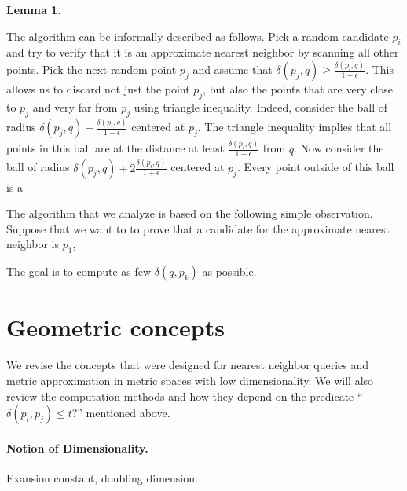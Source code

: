 \documentclass[10pt]{article}
\newcommand{\eps}{\epsilon}
\newcommand{\dist}{\delta}
\newtheorem{lemma}[theorem]{Lemma}
\begin{document}
\begin{lemma}
\end{lemma}


The algorithm can be informally described as follows. Pick a random candidate $p_i$ and try to verify that
it is an approximate nearest neighbor by scanning all other points. Pick the next random point $p_j$
and assume that $\dist(p_j, q) \geq \frac{\dist(p_i, q)}{1 + \eps}$. This allows us to discard not just the point
$p_j$, but also the points that are very close to $p_j$ and very far from $p_j$ using triangle inequality.
Indeed, consider the ball of radius $ \dist(p_j, q) - \frac{ \dist(p_i, q) }{ 1+\eps} $ centered at $p_j$.
The triangle inequality implies that all points in this ball are at the distance at least $\frac{ \dist(p_i, q) }{ 1+\eps}$
from $q$. Now consider the ball of radius $\dist(p_j, q) + 2 \frac{\dist(p_i, q)}{1+ \eps}$ centered at $p_j$. 
Every point outside of this ball is a


The algorithm that we analyze is based on the following simple observation.
Suppose that we want to to prove that a candidate for the approximate nearest neighbor is $p_1$,



\begin{algorithmic}
\Function{ApproximateNearestNeighbor}{$P, q, \eps$}
\EndFor
{}
\Else
\EndIf
\EndFunction
\end{algorithmic}


The goal is to compute
as few $\dist(q, p_k)$ as possible.


\section{Geometric concepts}

We revise the concepts that were designed for nearest neighbor queries
and metric approximation in metric spaces with low dimensionality.
We will also review the computation methods and how they depend
on the predicate ``$\dist(p_i,p_j)\leq t$?'' mentioned above.

\paragraph{Notion of Dimensionality.}
%
Exansion constant, doubling dimension.
\end{document}
